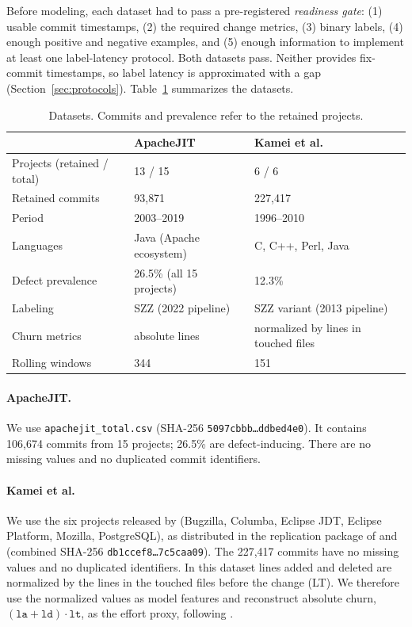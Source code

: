\documentclass[11pt,a4paper]{article}
\begin{document}
Before modeling, each dataset had to pass a pre-registered \emph{readiness gate}: (1) usable commit timestamps, (2) the required change metrics, (3) binary labels, (4) enough positive and negative examples, and (5) enough information to implement at least one label-latency protocol. Both datasets pass. Neither provides fix-commit timestamps, so label latency is approximated with a gap (Section~\ref{sec:protocols}). Table~\ref{tab:datasets} summarizes the datasets.

\begin{table}[t]
\centering
\caption{Datasets. Commits and prevalence refer to the retained projects.}
\label{tab:datasets}
\small
\begin{tabular}{lll}
\toprule
 & ApacheJIT \citep{keshavarz2022} & Kamei et al.\ \citep{kamei2013} \\
\midrule
Projects (retained / total) & 13 / 15 & 6 / 6 \\
Retained commits & 93{,}871 & 227{,}417 \\
Period & 2003--2019 & 1996--2010 \\
Languages & Java (Apache ecosystem) & C, C++, Perl, Java \\
Defect prevalence & 26.5\% (all 15 projects) & 12.3\% \\
Labeling & SZZ (2022 pipeline) & SZZ variant (2013 pipeline) \\
Churn metrics & absolute lines & normalized by lines in touched files \\
Rolling windows & 344 & 151 \\
\bottomrule
\end{tabular}
\end{table}

\paragraph{ApacheJIT.} We use \texttt{apachejit\_total.csv} (SHA-256 \texttt{5097cbbb\ldots ddbed4e0}). It contains 106{,}674 commits from 15 projects; 26.5\% are defect-inducing. There are no missing values and no duplicated commit identifiers.

\paragraph{Kamei et al.} We use the six projects released by \citet{kamei2013} (Bugzilla, Columba, Eclipse JDT, Eclipse Platform, Mozilla, PostgreSQL), as distributed in the replication package of \citet{yang2016} and \citet{fu2017} (combined SHA-256 \texttt{db1ccef8\ldots 7c5caa09}). The 227{,}417 commits have no missing values and no duplicated identifiers. In this dataset lines added and deleted are normalized by the lines in the touched files before the change (LT). We therefore use the normalized values as model features and reconstruct absolute churn, $(\texttt{la}+\texttt{ld})\cdot\texttt{lt}$, as the effort proxy, following \citet{yang2016}.
\end{document}
